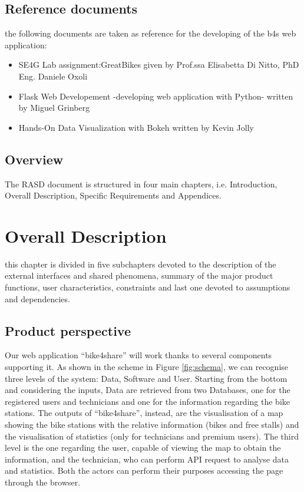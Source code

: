 \documentclass{article}
\begin{document}
\subsection{Reference documents}
the following documents are taken as reference for the developing of the b4s web application:
\begin{itemize}
    \item SE4G Lab assignment:GreatBikes given by Prof.ssa Elisabetta Di Nitto, PhD Eng. Daniele Oxoli
    \item Flask Web Developement -developing web application with Python- written by Miguel Grinberg
    \item Hands-On Data Visualization with Bokeh written by Kevin Jolly 
\end{itemize}


\subsection{Overview}
The RASD document is structured in four main chapters, i.e. Introduction, Overall Description, Specific Requirements and Appendices. 

\section{Overall Description}
this chapter is divided in five subchapters devoted to the description of the external interfaces and shared phenomena, summary of the major product functions, user characteristics, constraints and last one devoted to assumptions and dependencies.
\subsection{Product perspective}
Our web application “bike4share” will work thanks to several components supporting it. As shown in the scheme in Figure \ref{fig:schema}, we can recognise three levels of the system: Data, Software and User. 
Starting from the bottom and considering the inputs, Data are retrieved from two Databases, one for the registered users and technicians and one for the information regarding the bike stations. 
The outputs of “bike4share”, instead, are the visualisation of a map showing the bike stations with the relative information (bikes and free stalls) and the visualisation of statistics (only for technicians and premium users). 
The third level is the one regarding the user, capable of viewing the map to obtain the information, and the technician, who can perform API request to analyse data and statistics. Both the actors can perform their purposes accessing the page through the browser. 
\end{document}
